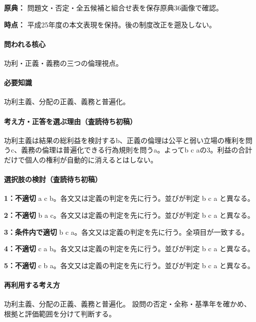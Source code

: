 \noindent\textbf{原典：} 問題文・否定・全五候補と組合せ表を保存原典36画像で確認。\par

\noindent\textbf{時点：} 平成25年度の本文表現を保持。後の制度改正を遡及しない。\par

\paragraph{問われる核心} 功利・正義・義務の三つの倫理視点。

\paragraph{必要知識} 功利主義、分配の正義、義務と普遍化。

\paragraph{考え方・正答を選ぶ理由（査読待ち初稿）} 功利主義は結果の総利益を検討するb、正義の倫理は公平と弱い立場の権利を問うc、義務の倫理は普遍化できる行為規則を問うa。よってb c aの3。利益の合計だけで個人の権利が自動的に消えるとはしない。

\paragraph{選択肢の検討（査読待ち初稿）}\mbox{}\par

\noindent\textbf{1：不適切} a c b。各文又は定義の判定を先に行う。並びが判定 b c a と異なる。\par

\noindent\textbf{2：不適切} b a c。各文又は定義の判定を先に行う。並びが判定 b c a と異なる。\par

\noindent\textbf{3：条件内で適切} b c a。各文又は定義の判定を先に行う。全項目が一致する。\par

\noindent\textbf{4：不適切} c a b。各文又は定義の判定を先に行う。並びが判定 b c a と異なる。\par

\noindent\textbf{5：不適切} c b a。各文又は定義の判定を先に行う。並びが判定 b c a と異なる。\par

\paragraph{再利用する考え方} 功利主義、分配の正義、義務と普遍化。 設問の否定・全称・基準年を確かめ、根拠と評価範囲を分けて判断する。

